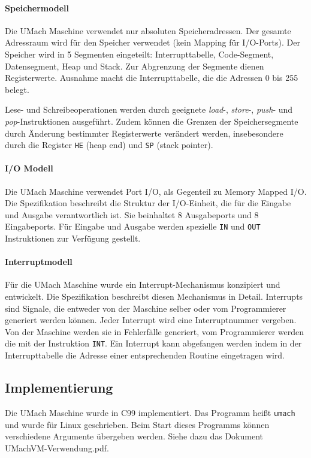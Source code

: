 \paragraph{Speichermodell}
Die UMach Maschine verwendet nur absoluten Speicheradressen. Der gesamte
Adressraum wird für den Speicher verwendet (kein Mapping für I/O-Ports). Der
Speicher wird in 5 Segmenten eingeteilt: Interrupttabelle, Code-Segment,
Datensegment, Heap und Stack. Zur Abgrenzung der Segmente dienen Registerwerte.
Ausnahme macht die Interrupttabelle, die die Adressen 0 bis 255 belegt.

Lese- und Schreibeoperationen werden durch geeignete \emph{load}-, 
\emph{store}-, \emph{push}- und \emph{pop}-Instruktionen ausgeführt. Zudem
können die Grenzen der Speichersegmente durch Änderung bestimmter Registerwerte
verändert werden, insebesondere durch die Register \texttt{HE} (heap end) und
\texttt{SP} (stack pointer).


\paragraph{I/O Modell}
Die UMach Maschine verwendet Port I/O, als Gegenteil zu Memory Mapped I/O. Die
Spezifikation beschreibt die Struktur der I/O-Einheit, die für die Eingabe und
Ausgabe verantwortlich ist. Sie beinhaltet 8 Ausgabeports und 8 Eingabeports.
Für Eingabe und Ausgabe werden spezielle \texttt{IN} und \texttt{OUT}
Instruktionen zur Verfügung gestellt.


\paragraph{Interruptmodell}

Für die UMach Maschine wurde ein Interrupt-Mechanismus konzipiert und
entwickelt. Die Spezifikation beschreibt diesen Mechanismus in Detail.
Interrupts sind Signale, die entweder von der Maschine selber oder vom
Programmierer generiert werden können. Jeder Interrupt wird eine Interruptnummer
vergeben. Von der Maschine werden sie in Fehlerfälle generiert, vom
Programmierer werden die mit der Instruktion \texttt{INT}. Ein Interrupt kann
abgefangen werden indem in der Interrupttabelle die Adresse einer entsprechenden
Routine eingetragen wird.


\subsection{Implementierung}

Die UMach Maschine wurde in C99 implementiert. Das Programm heißt
\texttt{umach} und wurde für Linux geschrieben. Beim Start dieses Programms
können verschiedene Argumente übergeben werden. Siehe dazu das Dokument
UMachVM-Verwendung.pdf.

